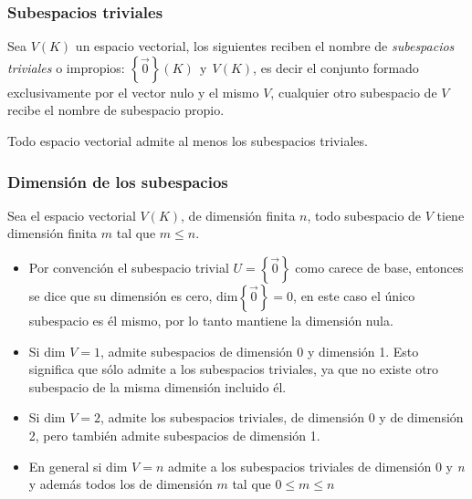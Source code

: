 \subsubsection{Subespacios triviales}

Sea \(V(K)\) un espacio vectorial, los siguientes reciben el nombre de \textit{subespacios triviales} o impropios: \(\left\{\vec{0}\right\} (K) ~~ \text{y} ~~ V(K)\), es decir el conjunto formado exclusivamente por el vector nulo y el mismo \(V\), cualquier otro subespacio de \(V\) recibe el nombre de subespacio propio.

Todo espacio vectorial admite al menos los subespacios triviales.

\subsubsection{Dimensión de los subespacios}

Sea el espacio vectorial \(V(K)\), de dimensión finita \(n\), todo subespacio de \(V\) tiene dimensión finita \(m\) tal que \(m \leq n\).

\begin{itemize}
  \item Por convención el subespacio trivial \(U=\left\{\vec{0}\right\}\) como carece de base, entonces se dice que su dimensión es cero, \(\text{dim}\left\{\vec{0}\right\}=0\), en este caso el único subespacio es él mismo, por lo tanto mantiene la dimensión nula.
  \item Si \(\text{dim }V=1\), admite subespacios de dimensión 0 y dimensión 1. Esto significa que sólo admite a los subespacios triviales, ya que no existe otro subespacio de la misma dimensión incluido él.
  \item Si \(\text{dim }V = 2\), admite los subespacios triviales, de dimensión 0 y de dimensión 2, pero también admite subespacios de dimensión 1.
  \item En general si \(\text{dim }V=n\) admite a los subespacios triviales de dimensión 0 y \textit{n} y además todos los de dimensión \(m\) tal que \(0 \leq m \leq n\)
\end{itemize}